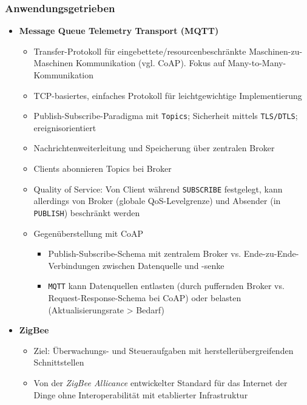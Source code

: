 \subsubsection{Anwendungsgetrieben}
\begin{itemize}
	\item \textbf{Message Queue Telemetry Transport (MQTT)}
	\begin{itemize}
		\item Transfer-Protokoll für eingebettete/resourcenbeschränkte Maschinen-zu-Maschinen Kommunikation (vgl. CoAP). Fokus auf Many-to-Many-Kommunikation
		\item TCP-basiertes, einfaches Protokoll für leichtgewichtige Implementierung
		\item Publish-Subscribe-Paradigma mit \texttt{Topics}; Sicherheit mittels \texttt{TLS/DTLS}; ereignisorientiert
		\item Nachrichtenweiterleitung und Speicherung über zentralen Broker
		\item Clients abonnieren Topics bei Broker
		\item Quality of Service: Von Client während \texttt{SUBSCRIBE} festgelegt, kann allerdings von Broker (globale QoS-Levelgrenze) und Absender (in \texttt{PUBLISH}) beschränkt werden
		\item Gegenüberstellung mit CoAP
		\begin{itemize}
			\item Publish-Subscribe-Schema mit zentralem Broker vs. Ende-zu-Ende-Verbindungen zwischen Datenquelle und -senke
			\item \texttt{MQTT} kann Datenquellen entlasten (durch puffernden Broker vs. Request-Response-Schema bei CoAP) oder belasten (Aktualisierungsrate > Bedarf)
		\end{itemize}
	\end{itemize}
	\item \textbf{ZigBee}
	\begin{itemize}
		\item Ziel: Überwachungs- und Steueraufgaben mit herstellerübergreifenden Schnittstellen
		\item Von der \textit{ZigBee Allicance} entwickelter Standard für das Internet der Dinge ohne Interoperabilität mit etablierter Infrastruktur

\end{itemize}
\end{itemize}
